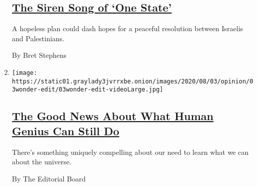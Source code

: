 \begin{enumerate}
  \hypertarget{the-siren-song-of-one-state}{%
  \subsection{\texorpdfstring{\href{/2020/08/03/opinion/israel-palestine-one-state-solution.html}{The
  Siren Song of `One
  State'}}{The Siren Song of `One State'}}\label{the-siren-song-of-one-state}}

  A hopeless plan could dash hopes for a peaceful resolution between
  Israelis and Palestinians.

  By Bret Stephens
\item
  \texttt{[image: https://static01.graylady3jvrrxbe.onion/images/2020/08/03/opinion/03wonder-edit/03wonder-edit-videoLarge.jpg]}

  \hypertarget{the-good-news-about-what-human-genius-can-still-do}{%
  \subsection{\texorpdfstring{\href{/2020/08/03/opinion/spacex-stonehenge-mars.html}{The
  Good News About What Human Genius Can Still
  Do}}{The Good News About What Human Genius Can Still Do}}\label{the-good-news-about-what-human-genius-can-still-do}}

  There's something uniquely compelling about our need to learn what we
  can about the universe.

  By The Editorial Board
\end{enumerate}

